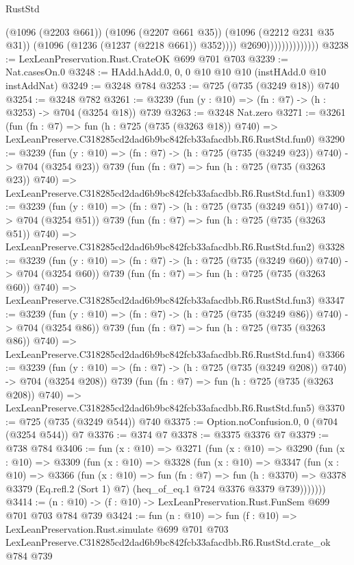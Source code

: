 \begin{lexlean}{RustStd}
\begin{coremodule}
                                    (@1096 (@2203 @661))
                                    (@1096 (@2207 @661 @35))
                                    (@1096 (@2212 @231 @35 @31))
                                    (@1096 (@1236 (@1237 (@2218 @661)) @352))))
                                @2690))))))))))))))
@3238 := LexLeanPreservation.Rust.CrateOK @699 @701 @703
@3239 := Nat.casesOn.{0}
@3248 := HAdd.hAdd.{0, 0, 0} @10 @10 @10 (instHAdd.{0} @10 instAddNat)
@3249 := @3248 @784
@3253 := @725 (@735 (@3249 @18)) @740
@3254 := @3248 @782
@3261 := @3239 (fun (y : @10) => (fn : @7) -> (h : @3253) -> @704 (@3254 @18)) @739
@3263 := @3248 Nat.zero
@3271 := @3261
    (fun (fn : @7) =>
    fun (h : @725 (@735 (@3263 @18)) @740) =>
    LexLeanPreserve.C318285cd2dad6b9bc842fcb33afacdbb.R6.RustStd.fun0)
@3290 := @3239
    (fun (y : @10) => (fn : @7) -> (h : @725 (@735 (@3249 @23)) @740) -> @704 (@3254 @23))
    @739
    (fun (fn : @7) =>
    fun (h : @725 (@735 (@3263 @23)) @740) =>
    LexLeanPreserve.C318285cd2dad6b9bc842fcb33afacdbb.R6.RustStd.fun1)
@3309 := @3239
    (fun (y : @10) => (fn : @7) -> (h : @725 (@735 (@3249 @51)) @740) -> @704 (@3254 @51))
    @739
    (fun (fn : @7) =>
    fun (h : @725 (@735 (@3263 @51)) @740) =>
    LexLeanPreserve.C318285cd2dad6b9bc842fcb33afacdbb.R6.RustStd.fun2)
@3328 := @3239
    (fun (y : @10) => (fn : @7) -> (h : @725 (@735 (@3249 @60)) @740) -> @704 (@3254 @60))
    @739
    (fun (fn : @7) =>
    fun (h : @725 (@735 (@3263 @60)) @740) =>
    LexLeanPreserve.C318285cd2dad6b9bc842fcb33afacdbb.R6.RustStd.fun3)
@3347 := @3239
    (fun (y : @10) => (fn : @7) -> (h : @725 (@735 (@3249 @86)) @740) -> @704 (@3254 @86))
    @739
    (fun (fn : @7) =>
    fun (h : @725 (@735 (@3263 @86)) @740) =>
    LexLeanPreserve.C318285cd2dad6b9bc842fcb33afacdbb.R6.RustStd.fun4)
@3366 := @3239
    (fun (y : @10) => (fn : @7) -> (h : @725 (@735 (@3249 @208)) @740) -> @704 (@3254 @208))
    @739
    (fun (fn : @7) =>
    fun (h : @725 (@735 (@3263 @208)) @740) =>
    LexLeanPreserve.C318285cd2dad6b9bc842fcb33afacdbb.R6.RustStd.fun5)
@3370 := @725 (@735 (@3249 @544)) @740
@3375 := Option.noConfusion.{0, 0} (@704 (@3254 @544)) @7
@3376 := @374 @7
@3378 := @3375 @3376 @7
@3379 := @738 @784
@3406 := fun (x : @10) =>
  @3271
    (fun (x : @10) =>
    @3290
      (fun (x : @10) =>
      @3309
        (fun (x : @10) =>
        @3328
          (fun (x : @10) =>
          @3347
            (fun (x : @10) =>
            @3366
              (fun (x : @10) =>
              fun (fn : @7) =>
              fun (h : @3370) =>
              @3378 @3379 (Eq.refl.{2} (Sort 1) @7) (heq_of_eq.{1} @724 @3376 @3379 @739)))))))
@3414 := (n : @10) -> (f : @10) -> LexLeanPreservation.Rust.FunSem @699 @701 @703 @784 @739
@3424 := fun (n : @10) =>
  fun (f : @10) =>
  LexLeanPreservation.Rust.simulate
    @699
    @701
    @703
    LexLeanPreserve.C318285cd2dad6b9bc842fcb33afacdbb.R6.RustStd.crate_ok
    @784
    @739
\end{coremodule}
\end{lexlean}
